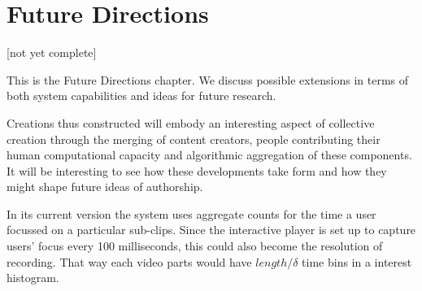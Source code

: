 \chapter{Future Directions}
\label{ch:future}

[not yet complete]

This is the Future Directions chapter. We discuss possible extensions in terms of both system capabilities and ideas for future research.

Creations thus constructed will embody an interesting aspect of collective creation through the merging of content creators, people contributing their human computational capacity and algorithmic aggregation of these components. It will be interesting to see how these developments take form and how they might shape future ideas of authorship.


In its current version the system uses aggregate counts for the time a user focussed on a particular sub-clips. Since the interactive player is set up to capture users' focus every 100 milliseconds, this could also become the resolution of recording. That way each video parts would have $length/\delta$ time bins in a interest histogram.

